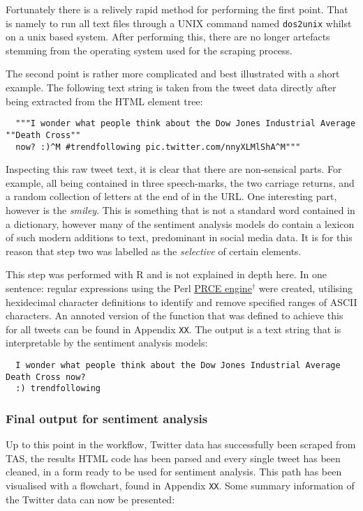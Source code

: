 \documentclass{article}
\begin{document}
Fortunately there is a relively rapid method for performing the first point. That is namely to run all text files through a UNIX command named \texttt{dos2unix} whilst on a unix based system. After performing this, there are no longer artefacts stemming from the operating system used for the scraping process.

The second point is rather more complicated and best illustrated with a short example. The following text string is taken from the tweet data directly after being extracted from the HTML element tree:

\begin{verbatim}
  """I wonder what people think about the Dow Jones Industrial Average ""Death Cross""
  now? :)^M #trendfollowing pic.twitter.com/nnyXLMlShA^M"""
\end{verbatim}

Inspecting this raw tweet text, it is clear that there are non-sensical parts. For example, all being contained in three speech-marks, the two carriage returns, and a random collection of letters at the end of in the URL. One interesting part, however is the \emph{smiley}. This is something that is not a standard word contained in a dictionary, however many of the sentiment analysis models do contain a lexicon of such modern additions to text, predominant in social media data. It is for this reason that step two was labelled as the \emph{selective} of certain elements.

This step was performed with R and is not explained in depth here. In one sentence: regular expressions using the Perl \href{http://www.pcre.org/}{PRCE engine$^{\dag{}}$} were created, utilising hexidecimal character definitions to identify and remove specified ranges of ASCII characters. An annoted version of the function that was defined to achieve this for all tweets can be found in Appendix \texttt{XX}.
The output is a text string that is interpretable by the sentiment analysis models:

\begin{verbatim}
  I wonder what people think about the Dow Jones Industrial Average Death Cross now?
  :) trendfollowing
\end{verbatim}


\subsubsection{Final output for sentiment analysis \label{final-output}}
\label{sec-1-3-6}

Up to this point in the workflow, Twitter data has successfully been scraped from TAS, the results HTML code has been parsed and every single tweet has been cleaned, in a form ready to be used for sentiment analysis. This path has been visualised with a flowchart, found in Appendix \texttt{XX}. Some summary information of the Twitter data can now be presented:
\end{document}
